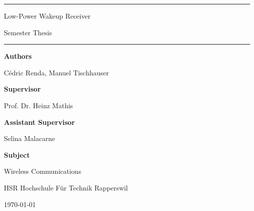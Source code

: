 \documentclass[a4paper,12pt]{book}
\begin{document}
\pagestyle{fancy}
\lhead{}
\rhead{}
\frontmatter
\newcommand\HRule{\noindent\rule{\linewidth}{1.5pt}}



\hypersetup{
	colorlinks=true,
	linktoc=all,
	linkcolor=blue
}


\newtheorem{satz}{Theorem}[chapter]
\newtheorem{problem}[satz]{Problem}
\newtheorem{hilfssatz}[satz]{Lemma}
\newtheorem{definition}[satz]{Definition}
\newtheorem{annahme}[satz]{Assumption}
\newtheorem{aufgabe}[satz]{Task}
\newenvironment{beispiel}[1][Example]{%
	\begin{proof}[#1]%
		\renewcommand{\qedsymbol}{$\bigcirc$}
	}{\end{proof}}


\begin{titlepage}
\HRule
\vspace*{10pt}
\begin{flushright}
{\Huge
Low-Power Wakeup Receiver}

\end{flushright}
\begin{flushright}
{\Large Semester Thesis}
\end{flushright}
\HRule

\vspace{70pt}
\large
\textbf{Authors}

Cédric Renda, Manuel Tischhauser

\textbf{Supervisor}

Prof. Dr. Heinz Mathis

\textbf{Assistant Supervisor}

Selina Malacarne

\textbf{Subject}

Wireless Communications



\begin{center}
HSR Hochschule Für Technik Rapperswil

\today
\end{center}
\end{titlepage}



\tableofcontents

\mainmatter








\end{document}
